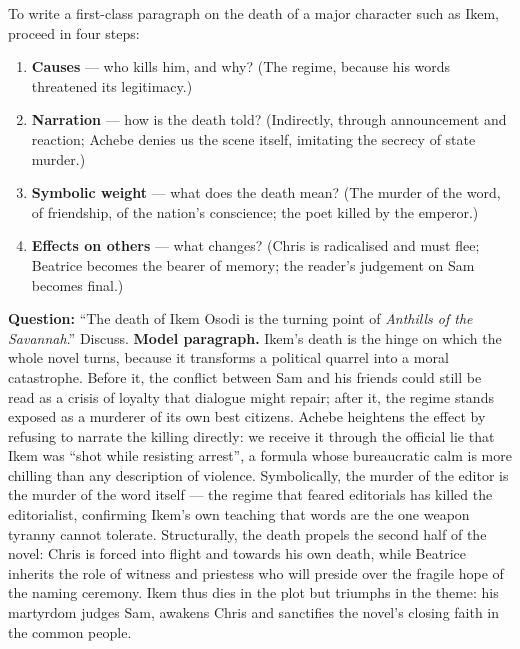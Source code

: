 \documentclass[11pt]{article}
\begin{document}
\begin{methode}
To write a first-class paragraph on the death of a major character such as Ikem, proceed in four steps:
\begin{enumerate}
\item \textbf{Causes} — who kills him, and why? (The regime, because his words threatened its legitimacy.)
\item \textbf{Narration} — how is the death told? (Indirectly, through announcement and reaction; Achebe denies us the scene itself, imitating the secrecy of state murder.)
\item \textbf{Symbolic weight} — what does the death mean? (The murder of the word, of friendship, of the nation's conscience; the poet killed by the emperor.)
\item \textbf{Effects on others} — what changes? (Chris is radicalised and must flee; Beatrice becomes the bearer of memory; the reader's judgement on Sam becomes final.)
\end{enumerate}
\end{methode}

\begin{exoresolu}
\textbf{Question:} ``The death of Ikem Osodi is the turning point of \emph{Anthills of the Savannah}.'' Discuss.
\tcblower
\textbf{Model paragraph.} Ikem's death is the hinge on which the whole novel turns, because it transforms a political quarrel into a moral catastrophe. Before it, the conflict between Sam and his friends could still be read as a crisis of loyalty that dialogue might repair; after it, the regime stands exposed as a murderer of its own best citizens. Achebe heightens the effect by refusing to narrate the killing directly: we receive it through the official lie that Ikem was ``shot while resisting arrest'', a formula whose bureaucratic calm is more chilling than any description of violence. Symbolically, the murder of the editor is the murder of the word itself — the regime that feared editorials has killed the editorialist, confirming Ikem's own teaching that words are the one weapon tyranny cannot tolerate. Structurally, the death propels the second half of the novel: Chris is forced into flight and towards his own death, while Beatrice inherits the role of witness and priestess who will preside over the fragile hope of the naming ceremony. Ikem thus dies in the plot but triumphs in the theme: his martyrdom judges Sam, awakens Chris and sanctifies the novel's closing faith in the common people.
\end{exoresolu}
\end{document}
